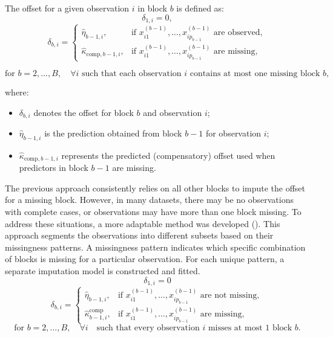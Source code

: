 The offset for a given observation \( i \) in block \( b \) is defined as:
\[
\delta_{1,i} = 0,
\]
\begin{equation*}
\delta_{b,i} =
\begin{cases} 
    \hat{\eta}_{b-1,i}, & \text{if } x^{(b-1)}_{i1}, \dots, x^{(b-1)}_{ip_{b-1}} \text{ are observed}, \\
    \hat{\kappa}_{\text{comp},b-1,i}, & \text{if } x^{(b-1)}_{i1}, \dots, x^{(b-1)}_{ip_{b-1}} \text{ are missing},
\end{cases}
\end{equation*}

\begin{equation*}
\text{for } b = 2, \dots, B, \quad \forall i \text{ such that each observation } i 
\text{ contains at most one missing block } b,
\end{equation*}

where:
\begin{itemize}
    \item \(\delta_{b,i}\) denotes the offset for block \( b \) and observation \( i \);
    \item \(\hat{\eta}_{b-1,i}\) is the prediction obtained from block \( b-1 \) for observation \( i \);
    \item \(\hat{\kappa}_{\text{comp},b-1,i}\) represents the predicted (compensatory) offset 
    used when predictors in block \( b-1 \) are missing.
\end{itemize}

The previous approach consistently relies on all other blocks to impute the offset for a missing block. However, in many datasets, there may be no observations with complete cases, or observations may have more than one block missing. To address these situations, a more adaptable method was developed (). This approach segments the observations into different subsets based on their missingness patterns. A missingness pattern indicates which specific combination of blocks is missing for a particular observation. For each unique pattern, a separate imputation model is constructed and fitted.
\[
\delta_{1,i} = 0
\]
\[
\delta_{b,i} =
\begin{cases} 
    \hat{\eta}_{b-1,i}, & \text{if } x^{(b-1)}_{i1}, \dots, x^{(b-1)}_{ip_{b-1}} \text{ are not missing}, \\
    \hat{\kappa}^{\text{comp}}_{b-1,i}, & \text{if } x^{(b-1)}_{i1}, \dots, x^{(b-1)}_{ip_{b-1}} \text{ are missing},
\end{cases}
\]
\[
\text{for } b = 2, \dots, B, \quad \forall i \quad \text{such that every observation } i \text{ misses at most 1 block } b.
\]

